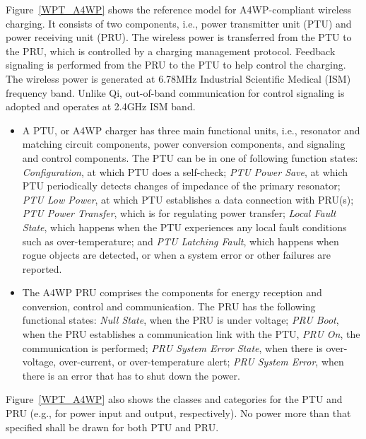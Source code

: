 \documentclass[twocolumn,10pt]{IEEEtran}
\begin{document}
Figure~\ref{WPT_A4WP} shows the reference model for A4WP-compliant wireless charging. It consists of two components, i.e., power transmitter unit (PTU) and  power receiving unit (PRU). The wireless power is transferred from the PTU to the PRU, which is controlled by a charging management protocol. Feedback signaling is performed from the PRU to the PTU to help control the charging. The wireless power is generated at 6.78MHz Industrial Scientific Medical (ISM) frequency band. Unlike Qi, out-of-band communication for control signaling is adopted and operates at 2.4GHz ISM band.
 

\begin{itemize}

\item A PTU, or A4WP charger has three main functional units, i.e., resonator and matching circuit components, power conversion components, and signaling and control components. The PTU can be in one of following function states: {\em Configuration}, at which PTU does a self-check; {\em PTU Power Save}, at which PTU periodically detects changes of impedance of the primary resonator; {\em PTU Low Power}, at which PTU establishes a data connection with PRU(s); {\em PTU Power Transfer}, which is for regulating power transfer; {\em Local Fault State}, which happens when the PTU experiences any local fault conditions such as over-temperature; and {\em  PTU Latching Fault}, which happens when rogue objects are detected, or when a system error or other failures are reported.
 
\item The A4WP PRU comprises the components for energy reception and conversion, control and communication. The PRU has the following functional states: {\em Null State}, when the PRU is under voltage; {\em PRU Boot}, when the PRU establishes a communication link with the PTU, {\em PRU On}, the communication is performed; {\em PRU System Error State}, when there is over-voltage, over-current, or over-temperature alert; {\em PRU System Error}, when there is an error that has to shut down the power. 
\end{itemize} 
Figure~\ref{WPT_A4WP} also shows the classes and categories for the PTU and PRU (e.g., for power input and output, respectively). No power more than that specified shall be drawn for both PTU and PRU. 
 
\end{document}
